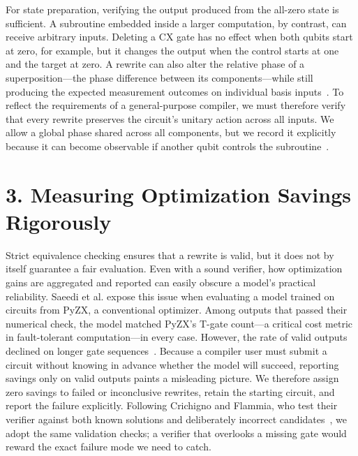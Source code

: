 \documentclass[12pt]{article}
\begin{document}
For state preparation, verifying the output produced from the all-zero state is sufficient. A subroutine
embedded inside a larger computation, by contrast, can receive arbitrary inputs. Deleting a CX gate has
no effect when both qubits start at zero, for example, but it changes the output when the control starts
at one and the target at zero. A rewrite can also alter the relative phase of a superposition—the phase
difference between its components—while still producing the expected measurement outcomes on individual
basis inputs~\cite{burgholzer-wille}. To reflect the requirements of a general-purpose compiler, we must
therefore verify that every rewrite preserves the circuit’s unitary action across all inputs. We allow a
global phase shared across all components, but we record it explicitly because it can become observable
if another qubit controls the subroutine~\cite{araujo}.

\section{3. Measuring Optimization Savings Rigorously}

Strict equivalence checking ensures that a rewrite is valid, but it does not by itself guarantee a fair
evaluation. Even with a sound verifier, how optimization gains are aggregated and reported can easily
obscure a model’s practical reliability. Saeedi et al. expose this issue when evaluating a model trained
on circuits from PyZX, a conventional optimizer. Among outputs that passed their numerical check, the
model matched PyZX’s T-gate count—a critical cost metric in fault-tolerant computation—in every case.
However, the rate of valid outputs declined on longer gate sequences~\cite{drift}. Because a compiler
user must submit a circuit without knowing in advance whether the model will succeed, reporting savings
only on valid outputs paints a misleading picture. We therefore assign zero savings to failed or
inconclusive rewrites, retain the starting circuit, and report the failure explicitly. Following
Crichigno and Flammia, who test their verifier against both known solutions and deliberately incorrect
candidates~\cite{crichigno}, we adopt the same validation checks; a verifier that overlooks a missing
gate would reward the exact failure mode we need to catch.
\end{document}
